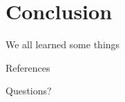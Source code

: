 \documentclass{beamer}\usepackage[]{graphicx}\usepackage[]{color}
\begin{document}
\section{Conclusion}
\begin{frame}{We all learned some things}
   \end{frame}
   
\begin{frame}[allowframebreaks]{References}

  
  

\end{frame}
   
\begin{frame}[standout]
  Questions?
\end{frame}

\appendix



   
\end{document}
